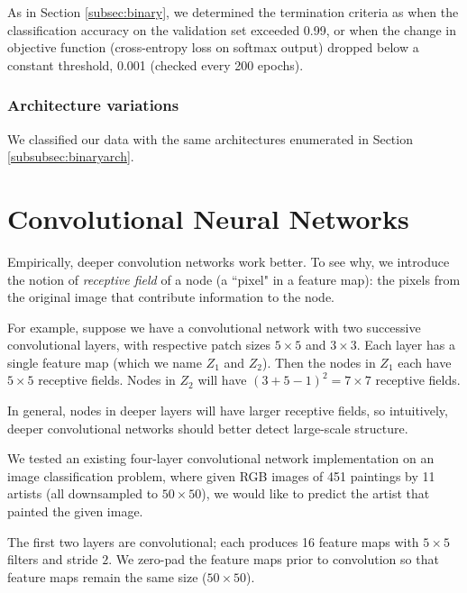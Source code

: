 \documentclass{article}
\begin{document}
\begin{multicols}{2}
As in Section \ref{subsec:binary}, we determined the termination criteria as
when the classification accuracy on the validation set exceeded 0.99,
or when the change in objective function (cross-entropy loss on softmax output)
dropped below a constant threshold, 0.001 (checked every 200 epochs).

\subsubsection{Architecture variations}

We classified our data with the same architectures enumerated in Section \ref{subsubsec:binaryarch}.


\section{Convolutional Neural Networks}


Empirically, deeper convolution networks work better.
To see why, we introduce the notion of \emph{receptive field}
of a node (a ``pixel" in a feature map):
the pixels from the original image that contribute information
to the node.

For example,
suppose we have a convolutional network
with two successive convolutional layers,
with respective patch sizes $5\times 5$ and $3\times 3$.
Each layer has a single feature map (which we name $Z_1$ and $Z_2$).
Then the nodes in $Z_1$ each have $5\times 5$ receptive fields.
Nodes in $Z_2$ will have $(3 + 5 - 1)^2 = 7\times 7$ receptive fields.

In general,
nodes in deeper layers will have larger receptive fields,
so intuitively,
deeper convolutional networks should better detect large-scale structure.

We tested an existing four-layer convolutional network implementation
on an image classification problem,
where given RGB images of 451 paintings by 11 artists
(all downsampled to $50\times 50$),
we would like to predict the artist that painted the given image.

The first two layers are convolutional;
each produces 16 feature maps
with $5\times 5$ filters and stride $2$.
We zero-pad the feature maps prior to convolution
so that feature maps remain the same size ($50\times 50$).


\end{multicols}
\end{document}
